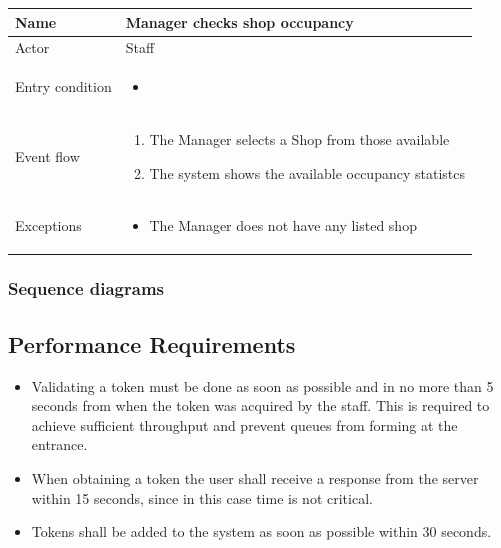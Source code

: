 \begin{table}[H]
    \begin{tabu} to \textwidth {|X|X[4]|}
        \hline
        Name            & Manager checks shop occupancy \\ \hline
        Actor           & Staff                         \\ \hline
        Entry condition & \begin{itemize}
            \item {}
        \end{itemize}    \\ \hline
        Event flow      & \begin{enumerate}
            \item The Manager selects a Shop from those available
            \item The system shows the available occupancy statistcs
        \end{enumerate}    \\ \hline
        Exceptions      & \begin{itemize}
            \item The Manager does not have any listed shop
        \end{itemize}    \\ \hline
    \end{tabu}
\end{table}

\subsubsection{Sequence diagrams}

\subsection{Performance Requirements}
\begin{itemize}
    \item Validating a token must be done as soon as possible and in no more than 5 seconds from when the token was acquired by the staff. This is required to achieve sufficient throughput and prevent queues from forming at the entrance.
    \item When obtaining a token the user shall receive a response from the server within 15 seconds, since in this case time is not critical.
    \item Tokens shall be added to the system as soon as possible within 30 seconds.
\end{itemize}
